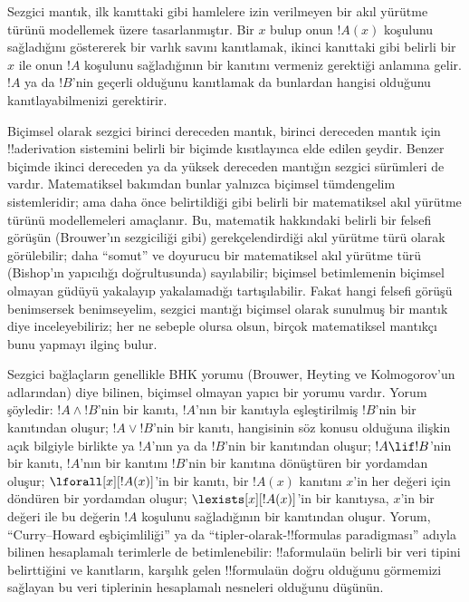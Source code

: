 Sezgici mantık, ilk kanıttaki gibi hamlelere izin verilmeyen bir akıl yürütme
türünü modellemek üzere tasarlanmıştır. Bir $x$ bulup onun $!A(x)$ koşulunu
sağladığını göstererek bir varlık savını kanıtlamak, ikinci kanıttaki gibi
belirli bir~$x$ ile onun $!A$
koşulunu sağladığının bir kanıtını vermeniz gerektiği anlamına gelir. $!A$ ya
da $!B$'nin geçerli olduğunu kanıtlamak da bunlardan hangisi olduğunu
kanıtlayabilmenizi gerektirir.

Biçimsel olarak sezgici birinci dereceden mantık, birinci dereceden mantık için
!!a{derivation} sistemini belirli bir biçimde kısıtlayınca elde edilen şeydir.
Benzer biçimde ikinci dereceden ya da yüksek dereceden mantığın sezgici
sürümleri de vardır. Matematiksel bakımdan bunlar yalnızca biçimsel tümdengelim
sistemleridir; ama daha önce belirtildiği gibi belirli bir matematiksel akıl
yürütme türünü modellemeleri amaçlanır. Bu, matematik hakkındaki belirli bir
felsefi görüşün (Brouwer'ın sezgiciliği gibi) gerekçelendirdiği akıl yürütme
türü olarak görülebilir; daha ``somut'' ve doyurucu bir matematiksel akıl
yürütme türü (Bishop'ın yapıcılığı doğrultusunda) sayılabilir; biçimsel
betimlemenin biçimsel olmayan güdüyü yakalayıp yakalamadığı tartışılabilir.
Fakat hangi felsefi görüşü benimsersek benimseyelim, sezgici mantığı biçimsel
olarak sunulmuş bir mantık diye inceleyebiliriz; her ne sebeple olursa olsun,
birçok matematiksel mantıkçı bunu yapmayı ilginç bulur.

Sezgici bağlaçların genellikle BHK yorumu (Brouwer, Heyting ve Kolmogorov'un
adlarından) diye bilinen, biçimsel olmayan yapıcı bir yorumu vardır. Yorum
şöyledir: $!A \land !B$'nin bir kanıtı, $!A$'nın bir kanıtıyla eşleştirilmiş
$!B$'nin bir kanıtından oluşur; $!A \lor !B$'nin bir kanıtı, hangisinin söz
konusu olduğuna ilişkin açık bilgiyle birlikte ya $!A$'nın ya da $!B$'nin bir
kanıtından oluşur; $!A \lif !B$'nin bir kanıtı, $!A$'nın bir kanıtını
$!B$'nin bir kanıtına dönüştüren bir yordamdan oluşur; $\lforall[x][!A(x)]$'in
bir kanıtı, bir $!A(x)$ kanıtını $x$'in her değeri için döndüren bir yordamdan
oluşur; $\lexists[x][!A(x)]$'in bir kanıtıysa, $x$'in bir değeri ile bu değerin
$!A$ koşulunu sağladığının bir kanıtından oluşur. Yorum, ``Curry--Howard
eşbiçimliliği'' ya da ``tipler-olarak-!!{formula}s paradigması'' adıyla bilinen
hesaplamalı terimlerle de betimlenebilir: !!a{formula}{}ün belirli bir veri
tipini belirttiğini ve kanıtların, karşılık gelen !!{formula}{}ün doğru olduğunu
görmemizi sağlayan bu veri tiplerinin hesaplamalı nesneleri olduğunu düşünün.

